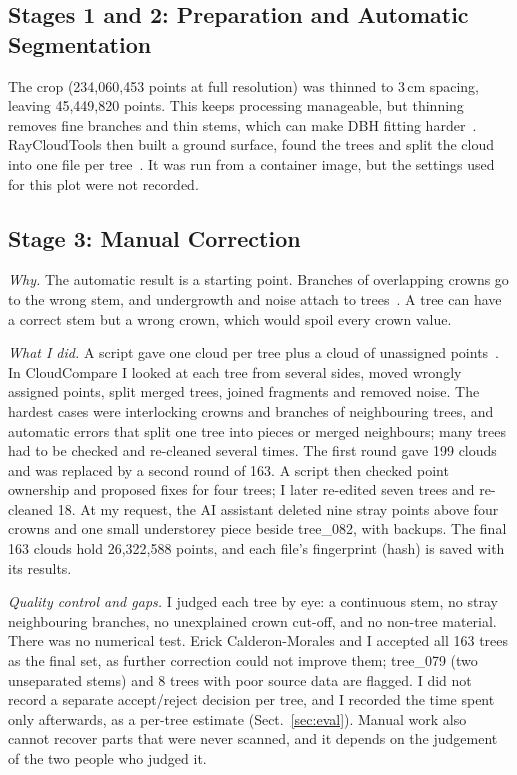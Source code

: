 \documentclass[runningheads]{llncs}
\begin{document}
\subsection{Stages 1 and 2: Preparation and Automatic Segmentation}\label{sec:prep}
The crop (234,060,453 points at full resolution) was thinned to 3\,cm spacing, leaving 45,449,820 points. This keeps processing manageable, but thinning removes fine branches and thin stems, which can make DBH fitting harder~\cite{calders2020}. RayCloudTools then built a ground surface, found the trees and split the cloud into one file per tree~\cite{pipeline}. It was run from a container image, but the settings used for this plot were not recorded.

\subsection{Stage 3: Manual Correction}\label{sec:manual}
\emph{Why.} The automatic result is a starting point. Branches of overlapping crowns go to the wrong stem, and undergrowth and noise attach to trees~\cite{calders2020,cherlet2026}. A tree can have a correct stem but a wrong crown, which would spoil every crown value.

\emph{What I did.} A script gave one cloud per tree plus a cloud of unassigned points~\cite{pipeline}. In CloudCompare I looked at each tree from several sides, moved wrongly assigned points, split merged trees, joined fragments and removed noise. The hardest cases were interlocking crowns and branches of neighbouring trees, and automatic errors that split one tree into pieces or merged neighbours; many trees had to be checked and re-cleaned several times. The first round gave 199 clouds and was replaced by a second round of 163. A script then checked point ownership and proposed fixes for four trees; I later re-edited seven trees and re-cleaned 18. At my request, the AI assistant deleted nine stray points above four crowns and one small understorey piece beside tree\_082, with backups. The final 163 clouds hold 26,322,588 points, and each file's fingerprint (hash) is saved with its results.

\emph{Quality control and gaps.} I judged each tree by eye: a continuous stem, no stray neighbouring branches, no unexplained crown cut-off, and no non-tree material. There was no numerical test. Erick Calderon-Morales and I accepted all 163 trees as the final set, as further correction could not improve them; tree\_079 (two unseparated stems) and 8 trees with poor source data are flagged. I did not record a separate accept/reject decision per tree, and I recorded the time spent only afterwards, as a per-tree estimate (Sect.~\ref{sec:eval}). Manual work also cannot recover parts that were never scanned, and it depends on the judgement of the two people who judged it.
\end{document}
